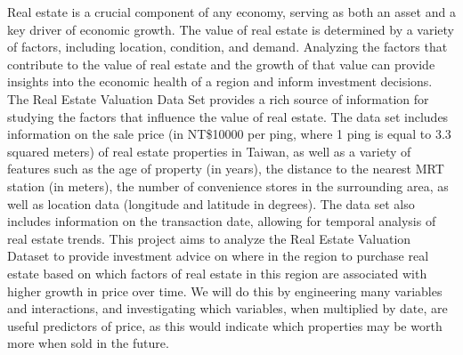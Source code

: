 Real estate is a crucial component of any economy, serving as both an asset and a key driver of economic growth. The value of real
estate is determined by a variety of factors, including location, condition, and demand. Analyzing the factors that contribute to
the value of real estate and the growth of that value can provide insights into the economic health of a region and inform
investment decisions. The Real Estate Valuation Data Set provides a rich source of information for studying the factors that
influence the value of real estate. The data set includes information on the sale price (in NT\$10000 per ping, where 1 ping is
equal to 3.3 squared meters) of real estate properties in Taiwan, as well as a variety of features such as the age of property (in
years), the distance to the nearest MRT station (in meters), the number of convenience stores in the surrounding area, as well as
location data (longitude and latitude in degrees). The data set also includes information on the transaction date, allowing for
temporal analysis of real estate trends. This project aims to analyze the Real Estate Valuation Dataset to provide investment
advice on where in the region to purchase real estate based on which factors of real estate in this region are associated with
higher growth in price over time. We will do this by engineering many variables and interactions, and investigating which
variables, when multiplied by date, are useful predictors of price, as this would indicate which properties may be worth more when
sold in the future.
